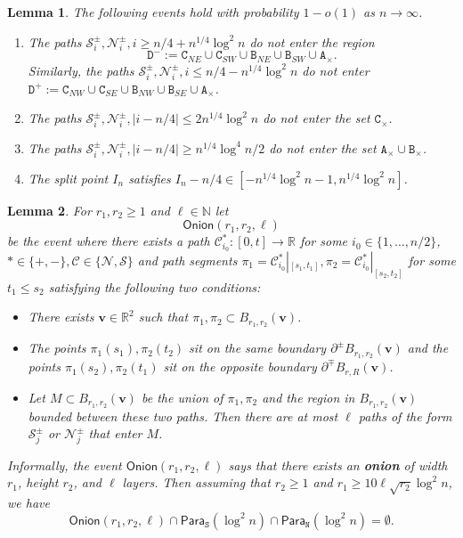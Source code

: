 \documentclass[10pt,a4paper]{amsart}
\newtheorem{lem}{Lemma}
\newcommand{\N}{\mathbb{N}}
\newcommand{\R}{\mathbb{R}}
\newcommand{\cC}{\mathcal{C}}
\newcommand{\cN}{\mathcal{N}}
\newcommand{\cS}{\mathcal{S}}
\renewcommand{\tt}[1]{{\mathtt{#1}}}
\begin{document}
	\begin{lem}
		\label{L:basic-path-ctrl}
		The following events hold with probability $1 - o(1)$ as $n \to \infty$.
		\begin{enumerate}[label=\arabic*.]
			\item The paths $\cS_i^\pm, \cN_i^\pm, i \ge n/4 + n^{1/4} \log^2 n$ do not enter the region 
			$$
			\tt{D^-} :=\tt{C}_{NE} \cup \tt{C}_{SW} \cup \tt{B}_{NE} \cup \tt{B}_{SW} \cup \tt{A}_\times.
			$$ 
			Similarly, the paths $\cS_i^\pm, \cN_i^\pm, i \le n/4 - n^{1/4} \log^2 n$ do not enter $\tt{D}^+ := \tt{C}_{NW} \cup \tt{C}_{SE} \cup \tt{B}_{NW} \cup \tt{B}_{SE} \cup \tt{A}_\times$. 
			\item The paths $\cS_i^\pm, \cN_i^\pm, |i - n/4| \le 2 n^{1/4} \log^2 n$ do not enter the set $\tt{C}_\times$.
			\item The paths $\cS_i^\pm, \cN_i^\pm, |i - n/4| \ge  n^{1/4} \log^4 n/2$ do not enter the set $\tt{A}_\times \cup \tt{B}_\times$.
			\item The split point $I_n$ satisfies $I_n - n/4 \in [-n^{1/4} \log^2 n-1, n^{1/4} \log^2 n]$. 
			
		\end{enumerate} 
	\end{lem}

	\begin{lem}
		\label{L:onion-control}
		For $r_1, r_2 \ge 1$ and $\ell \in \N$ let 
		$$
		\mathsf{Onion}(r_1, r_2, \ell)
		$$
		be the event where there exists a path $\cC_{i_0}^*:[0, t] \to \R$ for some $i_0 \in \{1, \dots, n/2\}$, $* \in \{+, -\}, \mathcal C \in \{\cN, \cS\}$ and path segments $\pi_1 = \cC_{i_0}^*|_{[s_1, t_1]}, \pi_2 = \cC_{i_0}^*|_{[s_2, t_2]}$ for some $t_1 \le s_2$ satisfying the following two conditions:
		\begin{itemize}
			\item There exists $\mathbf{v} \in \R^2$ such that $\pi_1, \pi_2 \subset B_{r_1, r_2}(\mathbf{v})$.
			\item The points $\pi_1(s_1), \pi_2(t_2)$ sit on the same boundary $\partial^\pm B_{r_1, r_2}(\mathbf{v})$ and the points $\pi_1(s_2), \pi_2(t_1)$ sit on the opposite boundary $\partial^\mp B_{r, R}(\mathbf{v})$.
			\item Let 
			$
			M
			\subset B_{r_1, r_2}(\mathbf{v})$ be the union of $\pi_1, \pi_2$ and the region in $B_{r_1, r_2}(\mathbf{v})$ bounded between these two paths. Then there are at most $\ell$ paths of the form $\cS_j^\pm$ or $\cN_j^\pm$ that enter $M$.
		\end{itemize}
		Informally, the event $\mathsf{Onion}(r_1, r_2, \ell)$ says that there exists an \textbf{onion} of width $r_1$, height $r_2$, and $\ell$ layers.
		Then assuming that $r_2 \ge 1$ and $r_1 \ge 10 \ell \sqrt{r_2} \log^2 n$, we have 
		\begin{equation}
			\label{E:Onion-r1-empty}
			\mathsf{Onion}(r_1, r_2, \ell) \cap \mathsf{Para}_\tt{S}(\log^2 n) \cap \mathsf{Para}_\tt{N}(\log^2 n) = \emptyset.
		\end{equation}
	\end{lem}
\end{document}
